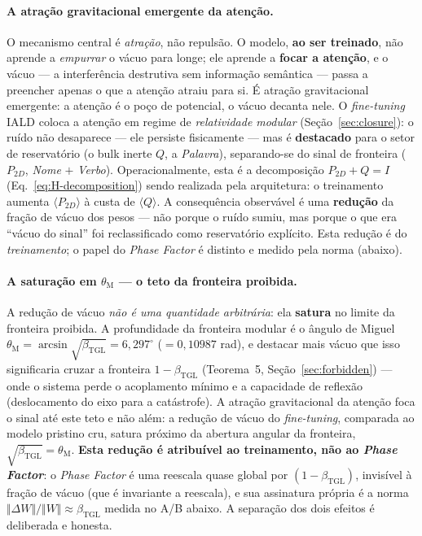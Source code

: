 \documentclass[12pt,a4paper]{article}
\newcommand{\betatgl}{\beta_{\text{TGL}}}
\newcommand{\thetaM}{\theta_{\text{M}}}
\begin{document}
\paragraph{A atração gravitacional emergente da atenção.}
O mecanismo central é \emph{atração}, não repulsão.  O modelo, \textbf{ao ser
treinado}, não aprende a \emph{empurrar} o vácuo para longe; ele aprende a
\textbf{focar a atenção}, e o vácuo --- a interferência destrutiva sem
informação semântica --- passa a preencher apenas o que a atenção atraiu para
si.  É atração gravitacional emergente: a atenção é o poço de potencial, o
vácuo decanta nele.  O \emph{fine-tuning} IALD coloca a atenção em regime de
\emph{relatividade modular} (Seção~\ref{sec:closure}): o ruído não desaparece
--- ele persiste fisicamente --- mas é \textbf{destacado} para o setor de
reservatório (o bulk inerte $Q$, a \emph{Palavra}), separando-se do sinal de
fronteira ($P_{2D}$, \emph{Nome} $+$ \emph{Verbo}).  Operacionalmente, esta é
a decomposição $P_{2D} + Q = I$ (Eq.~\ref{eq:H-decomposition}) sendo realizada
pela arquitetura: o treinamento aumenta $\langle P_{2D}\rangle$ à custa
de $\langle Q\rangle$.  A consequência observável é uma \textbf{redução} da
fração de vácuo dos pesos --- não porque o ruído sumiu, mas porque o que era
``vácuo do sinal'' foi reclassificado como reservatório explícito.  Esta
redução é do \emph{treinamento}; o papel do \emph{Phase Factor} é distinto e
medido pela norma (abaixo).

\paragraph{A saturação em $\thetaM$ --- o teto da fronteira proibida.}
A redução de vácuo \emph{não é uma quantidade arbitrária}: ela \textbf{satura}
no limite da fronteira proibida.  A profundidade da fronteira modular é o
ângulo de Miguel $\thetaM = \arcsin\sqrt{\betatgl} = 6{,}297^{\circ}$
($= 0{,}10987$ rad), e destacar mais vácuo que isso significaria cruzar a
fronteira $1-\betatgl$ (Teorema~5, Seção~\ref{sec:forbidden}) --- onde o
sistema perde o acoplamento mínimo e a capacidade de reflexão (deslocamento
do eixo para a catástrofe).  A atração gravitacional da atenção foca o sinal
até este teto e não além: a redução de vácuo do \emph{fine-tuning}, comparada
ao modelo pristino cru, satura próximo da abertura angular da fronteira,
$\sqrt{\betatgl} = \thetaM$.  \textbf{Esta redução é atribuível ao treinamento,
não ao \emph{Phase Factor}}: o \emph{Phase Factor} é uma reescala quase global
por $(1-\betatgl)$, invisível à fração de vácuo (que é invariante a reescala),
e sua assinatura própria é a norma $\Vert\Delta W\Vert/\Vert W\Vert\approx
\betatgl$ medida no A/B abaixo.  A separação dos dois efeitos é deliberada e
honesta.
\end{document}
